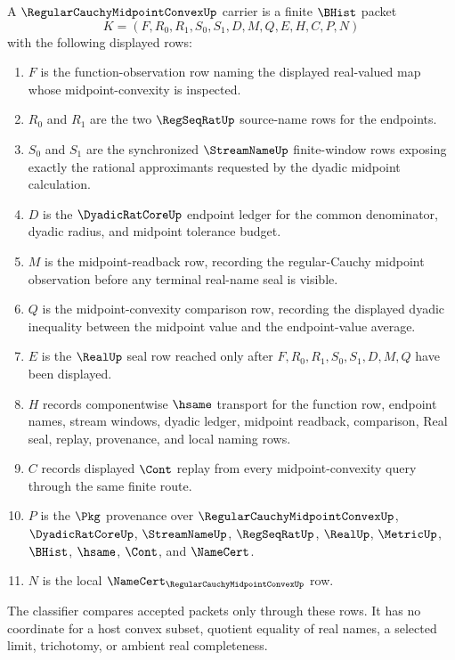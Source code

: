 \begin{definition}
\label{def:regular-cauchy-midpoint-convex-carrier}
A $\RegularCauchyMidpointConvexUp$ carrier is a finite $\BHist$ packet
$$
K=(F,R_0,R_1,S_0,S_1,D,M,Q,E,H,C,P,N)
$$
with the following displayed rows:
\begin{enumerate}
\item $F$ is the function-observation row naming the displayed real-valued map whose midpoint-convexity is inspected.
\item $R_0$ and $R_1$ are the two $\RegSeqRatUp$ source-name rows for the endpoints.
\item $S_0$ and $S_1$ are the synchronized $\StreamNameUp$ finite-window rows exposing exactly the rational approximants requested by the dyadic midpoint calculation.
\item $D$ is the $\DyadicRatCoreUp$ endpoint ledger for the common denominator, dyadic radius, and midpoint tolerance budget.
\item $M$ is the midpoint-readback row, recording the regular-Cauchy midpoint observation before any terminal real-name seal is visible.
\item $Q$ is the midpoint-convexity comparison row, recording the displayed dyadic inequality between the midpoint value and the endpoint-value average.
\item $E$ is the $\RealUp$ seal row reached only after $F,R_0,R_1,S_0,S_1,D,M,Q$ have been displayed.
\item $H$ records componentwise $\hsame$ transport for the function row, endpoint names, stream windows, dyadic ledger, midpoint readback, comparison, Real seal, replay, provenance, and local naming rows.
\item $C$ records displayed $\Cont$ replay from every midpoint-convexity query through the same finite route.
\item $P$ is the $\Pkg$ provenance over $\RegularCauchyMidpointConvexUp$, $\DyadicRatCoreUp$, $\StreamNameUp$, $\RegSeqRatUp$, $\RealUp$, $\MetricUp$, $\BHist$, $\hsame$, $\Cont$, and $\NameCert$.
\item $N$ is the local $\NameCert_{\RegularCauchyMidpointConvexUp}$ row.
\end{enumerate}
The classifier compares accepted packets only through these rows. It has no coordinate for a host convex subset, quotient equality of real names, a selected limit, trichotomy, or ambient real completeness.
\end{definition}

